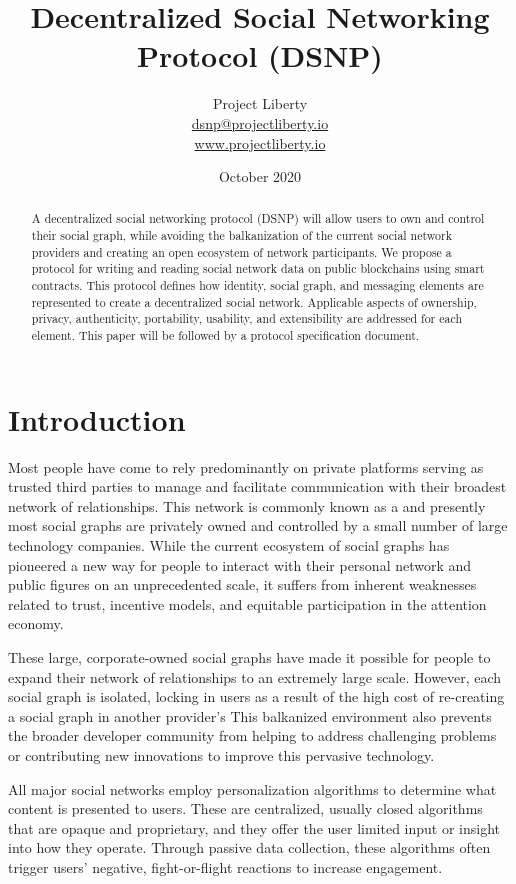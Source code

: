 \documentclass[12pt,letterpaper]{article}
\title{Decentralized Social Networking Protocol (DSNP)}
\author{
	Project Liberty\\
	\href{mailto:dsnp@projectliberty.io}{dsnp@projectliberty.io}\\
	\url{www.projectliberty.io}
}
\date{October 2020}
\begin{document}
\maketitle

\begin{abstract}
	A decentralized social networking protocol (DSNP) will allow users to own and control
	their social graph, while avoiding the balkanization of the current social network
	providers and creating an open ecosystem of network participants. We propose a protocol
	for writing and reading social network data on public blockchains using smart contracts.
	This protocol defines how identity, social graph, and messaging elements are represented
	to create a decentralized social network. Applicable aspects of ownership, privacy,
	authenticity, portability, usability, and extensibility are addressed for each element.
	This paper will be followed by a protocol specification document.
\end{abstract}

\raggedright

\section{Introduction}\label{sec:introduction}

Most people have come to rely predominantly on private platforms serving as trusted third
parties to manage and facilitate communication with their broadest network of
relationships. This network is commonly known as a  and presently most
social graphs are privately owned and controlled by a small number of large technology
companies. While the current ecosystem of social graphs has pioneered a new way for people
to interact with their personal network and public figures on an unprecedented scale, it
suffers from inherent weaknesses related to trust, incentive models, and equitable
participation in the attention economy.

These large, corporate-owned social graphs have made it possible for people to expand
their network of relationships to an extremely large scale. However, each social graph is
isolated, locking in users as a result of the high cost of re-creating a social graph in
another provider's  This balkanized environment also prevents the
broader developer community from helping to address challenging problems or contributing
new innovations to improve this pervasive technology.

All major social networks employ personalization algorithms to determine what content is
presented to users. These are centralized, usually closed algorithms that are opaque and
proprietary, and they offer the user limited input or insight into how they operate.
Through passive data collection, these algorithms often trigger users' negative,
fight-or-flight reactions to increase engagement.\cite{psychology_today_2017}
\end{document}
